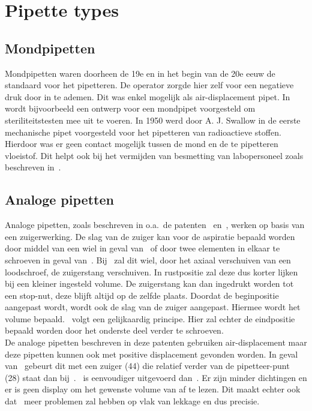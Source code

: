 \section{Pipette types}
\subsection{Mondpipetten}
Mondpipetten waren doorheen de 19e en in het begin van de 20e eeuw de standaard voor het pipetteren. De operator zorgde hier zelf voor een negatieve druk door in te ademen. Dit was enkel mogelijk als air-displacement pipet. In\ \cite{RN21} wordt bijvoorbeeld een ontwerp voor een mondpipet voorgesteld om steriliteitstesten mee uit te voeren. In 1950 werd door A. J. Swallow in\cite{RN18} de eerste mechanische pipet voorgesteld voor het pipetteren van radioactieve stoffen. Hierdoor was er geen contact mogelijk tussen de mond en de te pipetteren vloeistof. Dit helpt ook bij het vermijden van besmetting van labopersoneel zoals beschreven in\ \cite{RN20}.
\subsection{Analoge pipetten}
Analoge pipetten, zoals beschreven in o.a.\ de patenten\ \cite{RN16} en\ \cite{RN17}, werken op basis van een zuigerwerking. De slag van de zuiger kan voor de aspiratie bepaald worden door middel van een wiel in geval van\ \cite{RN17} of door twee elementen in elkaar te schroeven in geval van\ \cite{RN16}. Bij\ \cite{RN17} zal dit wiel, door het axiaal verschuiven van een loodschroef, de zuigerstang verschuiven. In rustpositie zal deze dus korter lijken bij een kleiner ingesteld volume. De zuigerstang kan dan ingedrukt worden tot een stop-nut, deze blijft altijd op de zelfde plaats. Doordat de beginpositie aangepast wordt, wordt ook de slag van de zuiger aangepast. Hiermee wordt het volume bepaald.\ \cite{RN16} volgt een gelijkaardig principe. Hier zal echter de eindpositie bepaald worden door het onderste deel verder te schroeven. 
\\[12pt]De analoge pipetten beschreven in deze patenten gebruiken air-displacement maar deze pipetten kunnen ook met positive displacement gevonden worden. In geval van\ \cite{RN17} gebeurt dit met een zuiger (44) die relatief verder van de pipetteer-punt (28) staat dan bij\ \cite{RN16}.\ \cite{RN16} is eenvoudiger uitgevoerd dan\ \cite{RN17}. Er zijn minder dichtingen en er is geen display om het gewenste volume van af te lezen. Dit maakt echter ook dat\ \cite{RN16} meer problemen zal hebben op vlak van lekkage en dus precisie.
